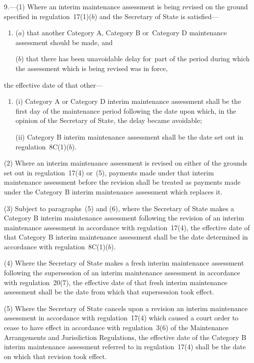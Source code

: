 \documentclass[a4paper,12pt]{article}
\begin{document}
9.—(1) Where an interim maintenance assessment is being revised on the ground specified in regulation~17(1)($b$) and the Secretary of State is satisfied---
\begin{enumerate}\item[]
($a$) that another Category A, Category B or~Category D maintenance assessment should be made, and

($b$) that there has been unavoidable delay for~part of the period during which the assessment which is being revised was in force,
\end{enumerate}
the effective date of that other---
\begin{enumerate}\item[]
(i) Category A or Category D interim maintenance assessment shall be the first day of the maintenance period following the date upon which, in the opinion of the Secretary of State, the delay became avoidable;

(ii) Category B interim maintenance assessment shall be the date set out in regulation~8C(1)($b$).
\end{enumerate}

(2) Where an interim maintenance assessment is revised on either of the grounds set out in regulation~17(4) or~(5), payments made under that interim maintenance assessment before the revision shall be treated as payments made under the Category B interim maintenance assessment which replaces it.

(3) Subject to paragraphs~(5) and (6), where the Secretary of State makes a Category B interim maintenance assessment following the revision of an interim maintenance assessment in accordance with regulation~17(4), the effective date of that Category B interim maintenance assessment shall be the date determined in accordance with regulation~8C(1)($b$).

(4) Where the Secretary of State makes a fresh interim maintenance assessment following the supersession of an interim maintenance assessment in accordance with regulation~20(7), the effective date of that fresh interim maintenance assessment shall be the date from which that supersession took effect.

(5) Where the Secretary of State cancels upon a revision an interim maintenance assessment in accordance with regulation~17(4) which caused a court order to cease to have effect in accordance with regulation~3(6) of the Maintenance Arrangements and Jurisdiction Regulations, the effective date of the Category B interim maintenance assessment referred to in regulation~17(4) shall be the date on which that revision took effect.
\end{document}

